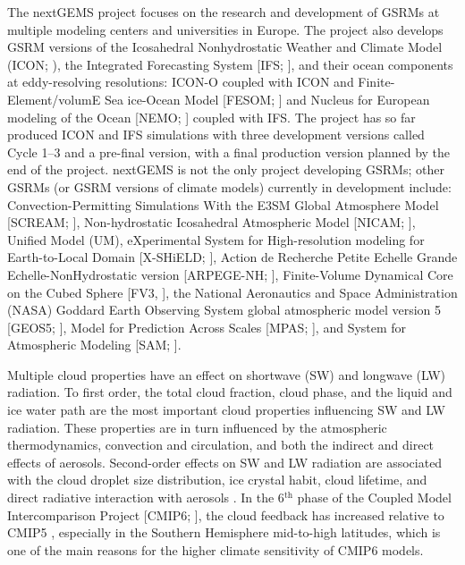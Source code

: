 \documentclass[draft]{agujournal2019}
\begin{document}
The nextGEMS project focuses on the research and development of GSRMs at multiple modeling centers and universities in Europe. The project also develops GSRM versions of the Icosahedral Nonhydrostatic Weather and Climate Model (ICON; ), the Integrated Forecasting System [IFS; ], and their ocean components at eddy-resolving resolutions: ICON-O \cite{korn2022} coupled with ICON and Finite-Element/volumE Sea ice-Ocean Model [FESOM; ] and Nucleus for European modeling of the Ocean [NEMO; ] coupled with IFS. The project has so far produced ICON and IFS simulations with three development versions called Cycle 1--3 and a pre-final version, with a final production version planned by the end of the project. nextGEMS is not the only project developing GSRMs; other GSRMs (or GSRM versions of climate models) currently in development include: Convection-Permitting Simulations With the E3SM Global Atmosphere Model [SCREAM; ], Non-hydrostatic Icosahedral Atmospheric Model [NICAM; ], Unified Model (UM), eXperimental System for High-resolution modeling for Earth-to-Local Domain [X-SHiELD; ], Action de Recherche Petite Echelle Grande Echelle-NonHydrostatic version [ARPEGE-NH; ], Finite-Volume Dynamical Core on the Cubed Sphere [FV3, ], the National Aeronautics and Space Administration (NASA) Goddard Earth Observing System global atmospheric model version 5 [GEOS5; ], Model for Prediction Across Scales [MPAS; ], and System for Atmospheric Modeling [SAM; ].

Multiple cloud properties have an effect on shortwave (SW) and longwave (LW) radiation. To first order, the total cloud fraction, cloud phase, and the liquid and ice water path are the most important cloud properties influencing SW and LW radiation. These properties are in turn influenced by the atmospheric thermodynamics, convection and circulation, and both the indirect and direct effects of aerosols. Second-order effects on SW and LW radiation are associated with the cloud droplet size distribution, ice crystal habit, cloud lifetime, and direct radiative interaction with aerosols \cite{boucher2013}. In the 6$^\mathrm{th}$ phase of the Coupled Model Intercomparison Project [CMIP6; ], the cloud feedback has increased relative to CMIP5 \cite{zelinka2020}, especially in the Southern Hemisphere mid-to-high latitudes, which is one of the main reasons for the higher climate sensitivity of CMIP6 models.
\end{document}
